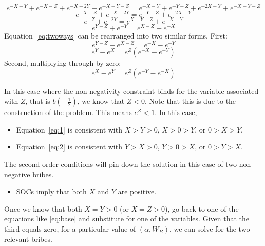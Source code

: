\documentclass[12pt]{article}
\begin{document}
\begin{itemize}
\[		\]
		\[
		  e^{-X-Y} + e^{-X-Z} + e^{-X-2Y} +e^{-X-Y-Z}= e^{-X-Y} + e^{-Y-Z} + e^{-2X-Y} +e^{-X-Y-Z}
		\]
		\[
		  e^{-X-Z} +e^{-X-2Y}= e^{-Y-Z} +e^{-2X-Y}
		\]
		\[
		  e^{-Z} +e^{-2Y}= e^{X-Y-Z} +e^{-X-Y}
		\]
		\begin{equation}
		  e^{Y-Z} +e^{-Y}= e^{X-Z} +e^{-X}
			\label{eq:twoways}
		\end{equation}
   Equation~\ref{eq:twoways} can be rearranged into two similar forms. First:
		\[
		  e^{Y-Z} - e^{X-Z}= e^{-X} - e^{-Y}
		\]
		\begin{equation}
		  e^{Y} - e^{X}= e^Z\left(e^{-X} - e^{-Y}\right)
			\label{eq:1}
		\end{equation}
  	Second, multiplying through by zero:
	  \begin{equation}
		  e^{X} - e^{Y}= e^Z\left(e^{-Y} - e^{-X}\right)
			\label{eq:2}
		\end{equation}
	\end{itemize}	
In this case where the non-negativity constraint binds for the variable associated with $Z$, that is $b\left(-\frac{1}{2}\right)$, we know that $Z < 0$. Note that this is due to the construction of the problem. This means $e^Z < 1$. In this case,
	\begin{itemize}
		\item Equation~\ref{eq:1} is consistent with $X>Y>0$, $X>0>Y$, or $0>X>Y$.
		\item Equation~\ref{eq:2} is consistent with $Y>X>0$, $Y>0>X$, or $0>Y>X$.
	\end{itemize}
The second order conditions will pin down the solution in this case of two non-negative bribes.

\begin{itemize}
	\item SOCs imply that both $X$ and $Y$ are positive.
\end{itemize}

Once we know that both $X=Y>0$ (or $X=Z>0$), go back to one of the equations like \ref{eq:base} and substitute for one of the variables. Given that the third equals zero, for a particular value of $\left(\alpha,W_B\right)$, we can solve for the two relevant bribes.



\newpage		
\end{document}
